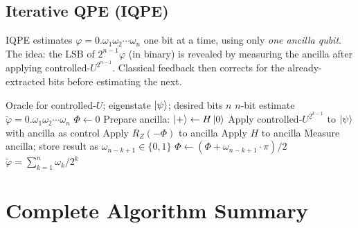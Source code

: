 \documentclass[12pt,a4paper]{article}
\begin{document}
\subsection{Iterative QPE (IQPE)}
\label{subsec:iqpe}

IQPE estimates $\varphi = 0.\omega_1\omega_2\cdots\omega_n$ one bit at a time,
using only \emph{one ancilla qubit}.  The idea: the LSB of $2^{n-1}\varphi$
(in binary) is revealed by measuring the ancilla after applying controlled-$U^{2^{n-1}}$.
Classical feedback then corrects for the already-extracted bits before
estimating the next.

\begin{algorithm}[h]
\caption{Iterative QPE (IQPE)}
\begin{algorithmic}[1]
\Require Oracle for controlled-$U$; eigenstate $\Ket{\psi}$; desired bits $n$
\Ensure $n$-bit estimate $\tilde\varphi = 0.\omega_1\omega_2\cdots\omega_n$
\State $\Phi \gets 0$ 
  \State Prepare ancilla: $\Ket{+} \gets H\Ket{0}$ 
  \State Apply controlled-$U^{2^{k-1}}$ to $\Ket{\psi}$ with ancilla as control 
  \State Apply $R_Z(-\Phi)$ to ancilla 
  \State Apply $H$ to ancilla 
  \State Measure ancilla; store result as $\omega_{n-k+1} \in \{0,1\}$
  \State $\Phi \gets (\Phi + \omega_{n-k+1}\cdot\pi) / 2$ 
\EndFor
\State \Return $\tilde\varphi = \sum_{k=1}^n \omega_k / 2^k$
\end{algorithmic}
\end{algorithm}

\newpage

\section{Complete Algorithm Summary}
\label{sec:summary}
\end{document}
